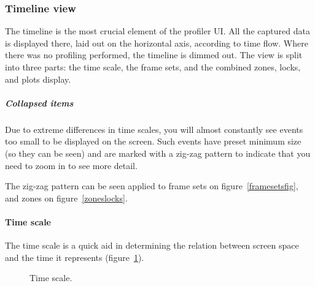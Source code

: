 \documentclass[hidelinks,titlepage,a4paper,twoside]{article}
\begin{document}
\subsubsection{Timeline view}

The timeline is the most crucial element of the profiler UI. All the captured data is displayed there, laid out on the horizontal axis, according to time flow. Where there was no profiling performed, the timeline is dimmed out. The view is split into three parts: the time scale, the frame sets, and the combined zones, locks, and plots display.

\subparagraph{Collapsed items}
\label{collapseditems}

Due to extreme differences in time scales, you will almost constantly see events too small to be displayed on the screen. Such events have preset minimum size (so they can be seen) and are marked with a zig-zag pattern to indicate that you need to zoom in to see more detail.

The zig-zag pattern can be seen applied to frame sets on figure~\ref{framesetsfig}, and zones on figure~\ref{zoneslocks}.

\paragraph{Time scale}

The time scale is a quick aid in determining the relation between screen space and the time it represents (figure~\ref{timescale}).

\begin{figure}[h]
\centering{}
\caption{Time scale.}
\label{timescale}
\end{figure}
\end{document}
